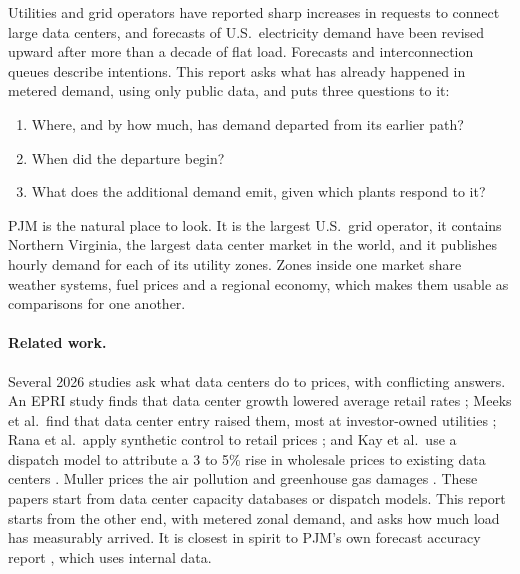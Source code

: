 \documentclass[11pt,a4paper]{article}
\begin{document}
Utilities and grid operators have reported sharp increases in requests to connect large data centers, and forecasts of U.S.\ electricity demand have been revised upward after more than a decade of flat load. Forecasts and interconnection queues describe intentions. This report asks what has already happened in metered demand, using only public data, and puts three questions to it:
\begin{enumerate}[label=(\roman*)]
\item Where, and by how much, has demand departed from its earlier path?
\item When did the departure begin?
\item What does the additional demand emit, given which plants respond to it?
\end{enumerate}

PJM is the natural place to look. It is the largest U.S.\ grid operator, it contains Northern Virginia, the largest data center market in the world, and it publishes hourly demand for each of its utility zones. Zones inside one market share weather systems, fuel prices and a regional economy, which makes them usable as comparisons for one another.

\paragraph{Related work.} Several 2026 studies ask what data centers do to prices, with conflicting answers. An EPRI study finds that data center growth lowered average retail rates \cite{epri2026}; Meeks et al.\ find that data center entry raised them, most at investor-owned utilities \cite{meeks2026}; Rana et al.\ apply synthetic control to retail prices \cite{rana2026}; and Kay et al.\ use a dispatch model to attribute a 3 to 5\% rise in wholesale prices to existing data centers \cite{kay2026}. Muller prices the air pollution and greenhouse gas damages \cite{muller2026}. These papers start from data center capacity databases or dispatch models. This report starts from the other end, with metered zonal demand, and asks how much load has measurably arrived. It is closest in spirit to PJM's own forecast accuracy report \cite{pjmaccuracy}, which uses internal data.
\end{document}
